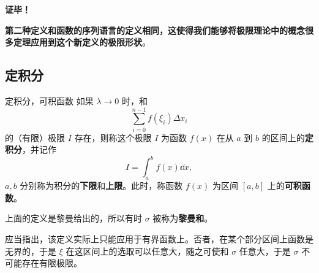 \textbf{证毕！}

\textbf{第二种定义和函数的序列语言的定义相同，这使得我们能够将极限理论中的概念很多定理应用到这个新定义的极限形状}。
\subsection{定积分}
\begin{definition}{定积分，可积函数}\label{def_DInt_3}
如果 $\lambda\rightarrow0$ 时，和  
\begin{equation}
\sum_{i=0}^{n-1}f(\xi_i)\Delta x_i
\end{equation}
的（有限）极限 $I$ 存在，则称这个极限 $I$ 为函数 $f(x)$ 在从 $a$ 到 $b$ 的区间上的\textbf{定积分}，并记作
\begin{equation}
I=\int_a^bf(x)\dd x,
\end{equation}
$a,b$ 分别称为积分的\textbf{下限}和\textbf{上限}。此时，称函数 $f(x)$ 为区间 $[a,b]$ 上的\textbf{可积函数}。
\end{definition}

上面的定义是黎曼给出的，所以有时 $\sigma$ 被称为\textbf{黎曼和}。

应当指出，该定义实际上只能应用于有界函数上。否者，在某个部分区间上函数是无界的，于是 $\xi$ 在这区间上的选取可以任意大，随之可使和 $\sigma$ 任意大，于是 $\sigma$ 不可能存在有限极限。